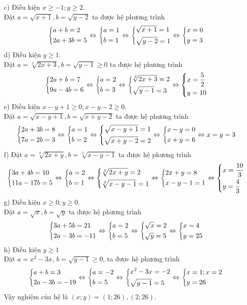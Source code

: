 \begin{ex}
{    c)
    Điều kiện $x\ge -1; y\ge 2$.\\
    Đặt $a=\sqrt{x+1}, b=\sqrt{y-2}$ ta được hệ phương trình 
    $$
    \left\{\begin{aligned}& a+b=2\\ & 2a+3b=5\end{aligned}\right.\Leftrightarrow \left\{\begin{aligned}& a= 1\\ & b=1\end{aligned}\right.\Leftrightarrow \left\{\begin{aligned}& \sqrt{x+1}=1\\ & \sqrt{y-2}=1\end{aligned}\right.\Leftrightarrow \left\{\begin{aligned}& x=0 \\ & y=3\end{aligned}\right.$$
    d)
     Điều kiện $ y\ge 1$.\\
    Đặt $a=\sqrt[3]{2x+3}, b=\sqrt{y-1}\ge 0$ ta được hệ phương trình 
    $$
    \left\{\begin{aligned}& 2a+b=7\\ & 9a-4b=6\end{aligned}\right.\Leftrightarrow \left\{\begin{aligned}& a= 2\\ & b=3\end{aligned}\right.\Leftrightarrow \left\{\begin{aligned}& \sqrt[3]{2x+3}=2\\ & \sqrt{y-1}=3\end{aligned}\right.\Leftrightarrow \left\{\begin{aligned}& x=\dfrac{5}{2} \\ & y=10\end{aligned}\right.$$
e)
 Điều kiện $x-y+1\ge 0; x-y-2\ge 0$.\\
    Đặt $a=\sqrt{x-y+1}, b=\sqrt{x+y-2}$ ta được hệ phương trình 
    $$
    \left\{\begin{aligned}& 2a+3b=8\\ & 7a-2b=3\end{aligned}\right.\Leftrightarrow \left\{\begin{aligned}& a= 1\\ & b=2\end{aligned}\right.\Leftrightarrow \left\{\begin{aligned}& \sqrt{x-y+1}=1\\ & \sqrt{x+y-2}=2\end{aligned}\right.\Leftrightarrow \left\{\begin{aligned}& x-y=0 \\ &x+ y=6\end{aligned}\right.\Leftrightarrow x=y=3$$    
    f)
     Đặt $a=\sqrt[3]{2x+y}, b=\sqrt[3]{x-y-1}$ ta được hệ phương trình 
    $$
    \left\{\begin{aligned}& 3a+4b=10\\ & 11a-17b=5\end{aligned}\right.\Leftrightarrow \left\{\begin{aligned}& a= 2\\ & b=1\end{aligned}\right.\Leftrightarrow \left\{\begin{aligned}& \sqrt[3]{2x+y}=2\\ & \sqrt[3]{x-y-1}=1\end{aligned}\right.
\Leftrightarrow \left\{\begin{aligned}& 2x+y=8\\ & x-y-1=1\end{aligned}\right.    
    \Leftrightarrow \left\{\begin{aligned}& x=\dfrac{10}{3} \\ & y=\dfrac{4}{3}\end{aligned}\right.$$
     g) Điều kiện $x\ge 0; y\ge 0$.\\
    Đặt $a=\sqrt{x}, b=\sqrt{y}$ ta được hệ phương trình 
    $$
    \left\{\begin{aligned}& 3a+5b=21\\ & 2a-3b=-11\end{aligned}\right.\Leftrightarrow \left\{\begin{aligned}& a= 2\\ & b=5\end{aligned}\right.\Leftrightarrow \left\{\begin{aligned}& \sqrt{x}=2\\ & \sqrt{y}=5\end{aligned}\right.\Leftrightarrow \left\{\begin{aligned}& x=4 \\ & y=25\end{aligned}\right.$$
    h) Điều kiện $y\ge 1$\\
    Đặt $a=x^2-3x$, $b=\sqrt{y-1}\ge 0$, ta  được hệ phương trình
    $$
    \left\{\begin{aligned}& a+b=3\\ & 2a-3b=-19\end{aligned}\right.\Leftrightarrow \left\{\begin{aligned}& a=-2\\ & b=5\end{aligned}\right.\Leftrightarrow \left\{\begin{aligned}& x^2-3x=-2\\ & \sqrt{y-1}=5\end{aligned}\right.\Leftrightarrow \left\{\begin{aligned} & x=1; x=2\\ & y=26\end{aligned}\right.$$ 
    Vậy nghiệm của  hệ là $(x;y)= (1;26), (2;26)$.
    }
\end{ex}


